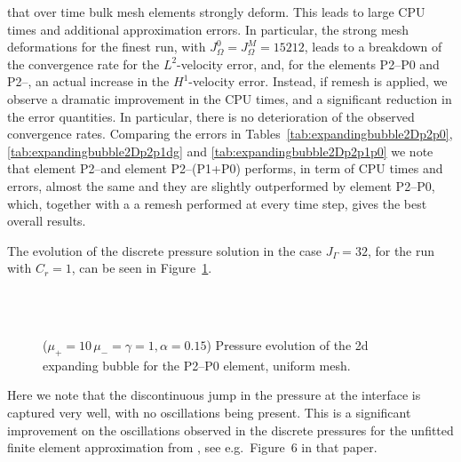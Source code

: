 that over time bulk mesh elements strongly deform. This leads to large CPU
times and additional approximation errors. In particular, the strong mesh
deformations for the finest run, with $J_\Omega^0 = J_\Omega^M = 15212$, leads
to a breakdown of the convergence rate for the $L^2$-velocity error, and, for
the elements P2--P0 and P2--\pdg, an actual increase in the $H^1$-velocity
error. Instead, if remesh is applied, we observe a dramatic improvement in the
CPU times, and a significant reduction in the error quantities. In particular,
there is no deterioration of the observed convergence rates. Comparing the
errors in Tables~\ref{tab:expandingbubble2Dp2p0},
\ref{tab:expandingbubble2Dp2p1dg} and \ref{tab:expandingbubble2Dp2p1p0} we note
that element P2--\pdg and element P2--(P1+P0) performs, in term of CPU times
and errors, almost the same and they are slightly outperformed by element
P2--P0, which, together with a a remesh performed at every time step, gives the
best overall results.

The evolution of the discrete pressure solution in the case $J_\Gamma = 32$,
for the run with $C_r = 1$, can be seen in
Figure~\ref{fig:expanding_bubble_uniform}.
\begin{figure}[htbp]
\centering
{}\\
\\
\caption[Stokes expanding bubble pressure uniform mesh]
{($\mu_+ = 10\,\mu_- = \gamma = 1,\alpha = 0.15$) Pressure evolution of
the 2d expanding bubble for the P2--P0 element, uniform mesh.}
\label{fig:expanding_bubble_uniform}
\end{figure}
Here we note that the discontinuous jump in the pressure at the interface is
captured very well, with no oscillations being present. This is a significant
improvement on the oscillations observed in the discrete pressures for the
unfitted finite element approximation from \cite{spurious}, see e.g.\
Figure~6 in that paper.

